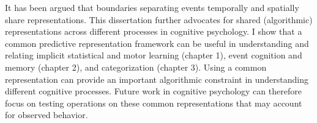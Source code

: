 It has been argued that boundaries separating events temporally and spatially share representations. This dissertation further advocates for shared (algorithmic) representations across different processes in cognitive psychology. I show that a common predictive representation framework can be useful in understanding and relating implicit statistical and motor learning (chapter 1), event cognition and memory (chapter 2), and categorization (chapter 3). Using a common representation can provide an important algorithmic constraint in understanding different cognitive processes. Future work in cognitive psychology can therefore focus on testing operations on these common representations that may account for observed behavior.

\appendix



% 
% 

	
\printbibliography



